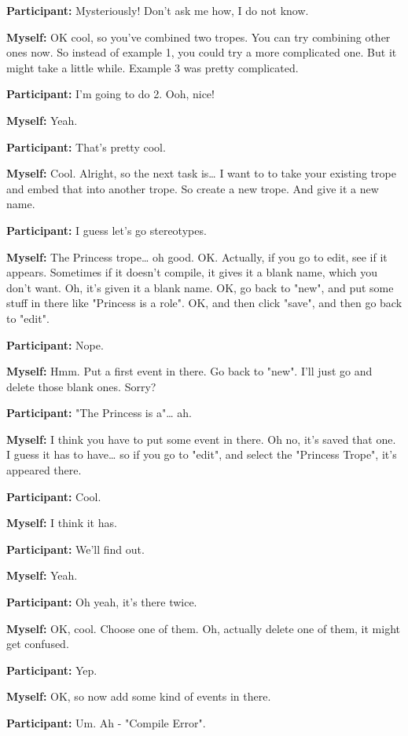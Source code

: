 \documentclass[11pt]{report}
\begin{document}
\begin{linenumbers}
\textbf{Participant:} Mysteriously! Don't ask me how, I do not know.

\textbf{Myself:} OK cool, so you've combined two tropes. You can try combining other ones now. So instead of example 1, you could try a more complicated one. But it might take a little while. Example 3 was pretty complicated.

\textbf{Participant:} I'm going to do 2. Ooh, nice!

\textbf{Myself:} Yeah.

\textbf{Participant:} That's pretty cool.

\textbf{Myself:} Cool. Alright, so the next task is\ldots{} I want to to take your existing trope and embed that into another trope. So create a new trope. And give it a new name.

\textbf{Participant:} I guess let's go stereotypes.

\textbf{Myself:} The Princess trope\ldots{} oh good. OK. Actually, if you go to edit, see if it appears. Sometimes if it doesn't compile, it gives it a blank name, which you don't want. Oh, it's given it a blank name. OK, go back to "new", and put some stuff in there like "Princess is a role". OK, and then click "save", and then go back to "edit".

\textbf{Participant:} Nope.

\textbf{Myself:} Hmm. Put a first event in there. Go back to "new". I'll just go and delete those blank ones. Sorry?

\textbf{Participant:} "The Princess is a"\ldots{} ah.

\textbf{Myself:} I think you have to put some event in there. Oh no, it's saved that one. I guess it has to have\ldots{} so if you go to "edit", and select the "Princess Trope", it's appeared there.

\textbf{Participant:} Cool.

\textbf{Myself:} I think it has.

\textbf{Participant:} We'll find out.

\textbf{Myself:} Yeah.

\textbf{Participant:} Oh yeah, it's there twice.

\textbf{Myself:} OK, cool. Choose one of them. Oh, actually delete one of them, it might get confused.

\textbf{Participant:} Yep.

\textbf{Myself:} OK, so now add some kind of events in there.

\textbf{Participant:} Um. Ah - "Compile Error".


\end{linenumbers}
\end{document}
